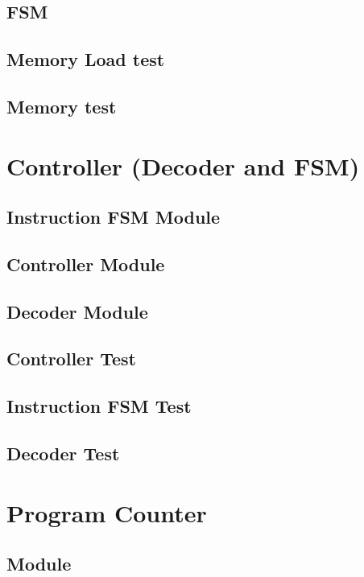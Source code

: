 \documentclass[11pt]{article}
\begin{document}
\subsection{FSM}
\tiny 
\subsection{Memory Load test}
\tiny 
\subsection{Memory test}
\tiny 
\section{Controller (Decoder and FSM)}
\subsection{Instruction FSM Module}
\tiny 
\subsection{Controller Module}
\tiny 
\subsection{Decoder Module}
\tiny 
\subsection{Controller Test}
\tiny 
\subsection{Instruction FSM Test}
\tiny 
\subsection{Decoder Test}
\tiny 
\section{Program Counter}
\subsection{Module}
\tiny 
\end{document}
